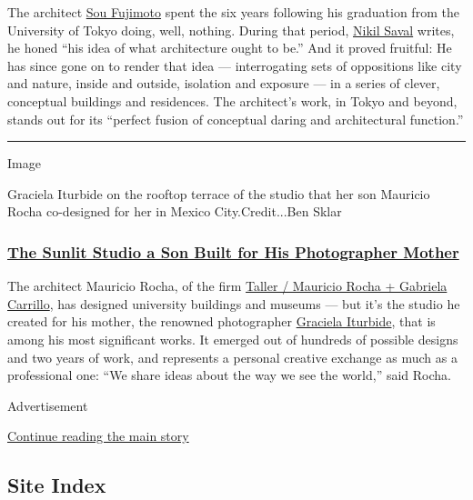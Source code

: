 The architect \href{http://www.sou-fujimoto.net/}{Sou Fujimoto} spent
the six years following his graduation from the University of Tokyo
doing, well, nothing. During that period,
\href{https://www.nytimes3xbfgragh.onion/by/nikil-saval}{Nikil Saval}
writes, he honed ``his idea of what architecture ought to be.'' And it
proved fruitful: He has since gone on to render that idea ---
interrogating sets of oppositions like city and nature, inside and
outside, isolation and exposure --- in a series of clever, conceptual
buildings and residences. The architect's work, in Tokyo and beyond,
stands out for its ``perfect fusion of conceptual daring and
architectural function.''

\begin{center}\rule{0.5\linewidth}{\linethickness}\end{center}

Image

Graciela Iturbide on the rooftop terrace of the studio that her son
Mauricio Rocha co-designed for her in Mexico City.Credit...Ben Sklar

\hypertarget{the-sunlit-studio-a-son-built-for-his-photographer-mother}{%
\subsubsection{\texorpdfstring{\textbf{\href{https://www.nytimes3xbfgragh.onion/2018/05/18/t-magazine/design/graciela-iturbide-mauricio-rocha-studio.html}{The
Sunlit Studio a Son Built for His Photographer
Mother}}}{The Sunlit Studio a Son Built for His Photographer Mother}}\label{the-sunlit-studio-a-son-built-for-his-photographer-mother}}

The architect Mauricio Rocha, of the firm
\href{http://www.tallerdearquitectura.com.mx/}{Taller / Mauricio Rocha +
Gabriela Carrillo}, has designed university buildings and museums ---
but it's the studio he created for his mother, the renowned photographer
\href{https://www.nytimes3xbfgragh.onion/2019/01/08/lens/graciela-iturbide-mexico-photos.html}{Graciela
Iturbide}, that is among his most significant works. It emerged out of
hundreds of possible designs and two years of work, and represents a
personal creative exchange as much as a professional one: ``We share
ideas about the way we see the world,'' said Rocha.

Advertisement

\protect\hyperlink{after-bottom}{Continue reading the main story}

\hypertarget{site-index}{%
\subsection{Site Index}\label{site-index}}

